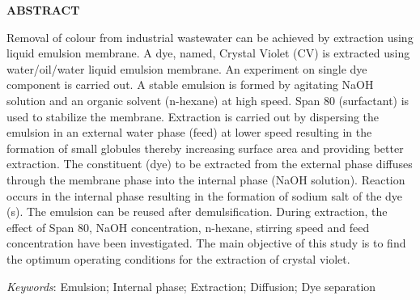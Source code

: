 \thispagestyle{plain}
\begin{center}
\textbf{\textbf{\fontsize{16pt}{24pt}\selectfont ABSTRACT}}
\end{center}

\vspace{0.3cm}
\fontsize{12pt}{18pt}\selectfont Removal of colour from industrial wastewater can be achieved by extraction using liquid
emulsion membrane. A dye, named, Crystal Violet (CV) is extracted using water/oil/water
liquid emulsion membrane. An experiment on single dye component is carried out. A stable
emulsion is formed by agitating NaOH solution and an organic solvent (n-hexane) at high
speed. Span 80 (surfactant) is used to stabilize the membrane. Extraction is carried out by
dispersing the emulsion in an external water phase (feed) at lower speed resulting in the
formation of small globules thereby increasing surface area and providing better extraction.
The constituent (dye) to be extracted from the external phase diffuses through the membrane
phase into the internal phase (NaOH solution). Reaction occurs in the internal phase resulting
in the formation of sodium salt of the dye (s). The emulsion can be reused after
demulsification. During extraction, the effect of Span 80, NaOH concentration, n-hexane,
stirring speed and feed concentration have been investigated. The main objective of this study
is to find the optimum operating conditions for the extraction of crystal violet. 

\textit{Keywords}: Emulsion; Internal phase; Extraction; Diffusion; Dye separation

\newpage
